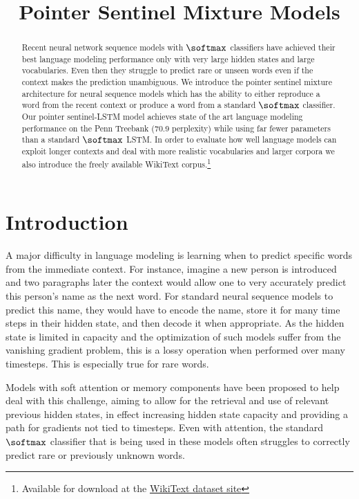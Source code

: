 \title{Pointer Sentinel Mixture Models}

\begin{abstract}
Recent neural network sequence models with $\softmax$ classifiers have achieved their best language modeling performance only with very large hidden states and large vocabularies. Even then they struggle to predict rare or unseen words even if the context makes the prediction unambiguous. We introduce the pointer sentinel mixture architecture for neural sequence models which has the ability to either reproduce a word from the recent context or produce a word from a standard $\softmax$ classifier. Our pointer sentinel-LSTM model achieves state of the art language modeling performance on the Penn Treebank (70.9 perplexity) while using far fewer parameters than a standard $\softmax$ LSTM. In order to evaluate how well language models can exploit longer contexts and deal with more realistic vocabularies and larger corpora we also introduce the freely available WikiText corpus.\footnote{Available for download at the \href{http://metamind.io/research/the-wikitext-long-term-dependency-language-modeling-dataset/}{WikiText dataset site}}
\end{abstract}

\section{Introduction}

A major difficulty in language modeling is learning when to predict specific words from the immediate context. For instance, imagine a new person is introduced and two paragraphs later the context would allow one to very accurately predict this person's name as the next word. For standard neural sequence models to predict this name, they would have to encode the name, store it for many time steps in their hidden state, and then decode it when appropriate. As the hidden state is limited in capacity and the optimization of such models suffer from the vanishing gradient problem, this is a lossy operation when performed over many timesteps. This is especially true for rare words.

Models with soft attention or memory components have been proposed to help deal with this challenge, aiming to allow for the retrieval and use of relevant previous hidden states, in effect increasing hidden state capacity and providing a path for gradients not tied to timesteps. Even with attention, the standard $\softmax$ classifier that is being used in these models often struggles to correctly predict rare or previously unknown words.

